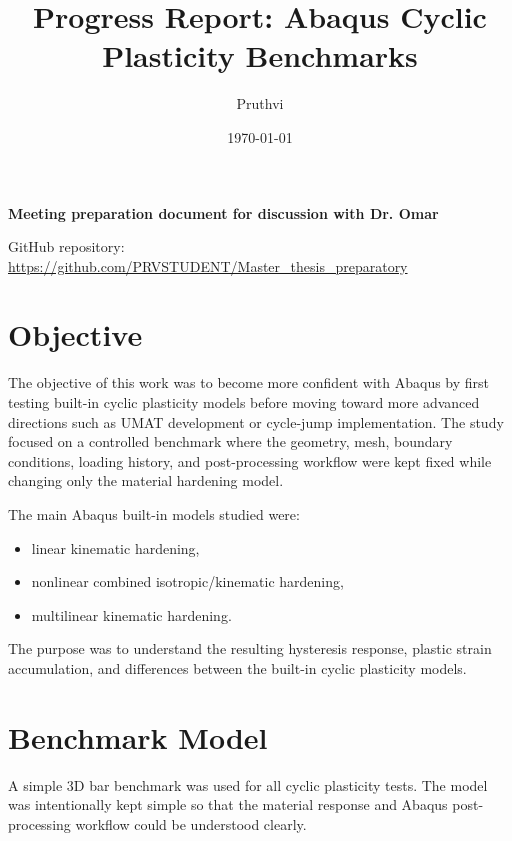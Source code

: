 \documentclass[11pt,a4paper]{article}
\title{\textbf{Progress Report: Abaqus Cyclic Plasticity Benchmarks}}
\author{Pruthvi}
\date{\today}
\begin{document}
\maketitle

\begin{center}
\textbf{Meeting preparation document for discussion with Dr. Omar}
\end{center}

\vspace{0.5cm}

\noindent
GitHub repository: \\
\url{https://github.com/PRVSTUDENT/Master_thesis_preparatory}

\section{Objective}

The objective of this work was to become more confident with Abaqus by first testing built-in cyclic plasticity models before moving toward more advanced directions such as UMAT development or cycle-jump implementation. The study focused on a controlled benchmark where the geometry, mesh, boundary conditions, loading history, and post-processing workflow were kept fixed while changing only the material hardening model.

The main Abaqus built-in models studied were:
\begin{itemize}
    \item linear kinematic hardening,
    \item nonlinear combined isotropic/kinematic hardening,
    \item multilinear kinematic hardening.
\end{itemize}

The purpose was to understand the resulting hysteresis response, plastic strain accumulation, and differences between the built-in cyclic plasticity models.

\section{Benchmark Model}

A simple 3D bar benchmark was used for all cyclic plasticity tests. The model was intentionally kept simple so that the material response and Abaqus post-processing workflow could be understood clearly.
\end{document}
